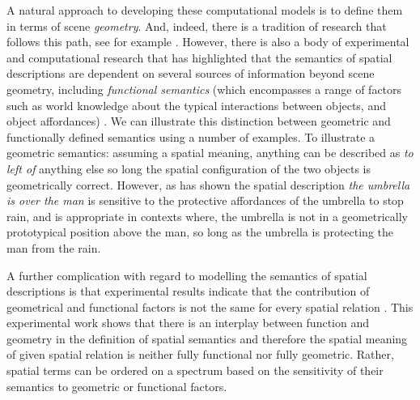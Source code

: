 A natural approach to developing these computational models is to define them in terms of scene \emph{geometry}. And, indeed, there is a tradition of research that follows this path, see for example \cite{logan/sadler:1996,KelleherCostello:2005,KelleherCostello:2009}. However, there is also a body of experimental and computational research that has highlighted that the semantics of spatial descriptions are dependent on several sources of information beyond scene geometry, including \emph{functional semantics} (which encompasses a range of factors such as world knowledge about the typical interactions between objects, and object affordances) \cite{Coventry:2004aa}. We can illustrate this distinction between geometric and functionally
defined semantics using a number of examples. To illustrate a geometric semantics: assuming a spatial meaning, anything
can be described as \emph{to left of} anything else so long the spatial configuration of the two objects is geometrically correct.
However, as \cite{CoventryEtAl:2001} has shown the spatial description \emph{the umbrella is over the man} is sensitive to the
 protective affordances of the umbrella to stop rain, and is appropriate in contexts where, the umbrella is not in a
geometrically prototypical position above the man, so long as the umbrella is protecting the man from the rain.

A further complication with regard to modelling the semantics of spatial descriptions is that experimental results indicate that the contribution of geometrical and
functional factors is not the same for every spatial relation \citep{Garrod:1999fk,CoventryEtAl:2001}.  This experimental work shows that there is
an interplay between function and geometry in the definition of spatial semantics
and therefore the spatial meaning of given spatial relation is neither fully functional nor fully geometric. Rather, spatial terms can be ordered on a spectrum
based on the sensitivity of their semantics to geometric or functional factors.

